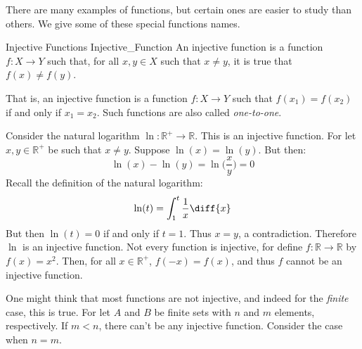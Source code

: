                 There are many examples of functions, but certain
                ones are easier to study than others. We give some
                of these special functions names.
                \begin{ldefinition}{Injective Functions}
                      {Injective_Function}
                    An \gls{injective function} is a function
                    $f:X\rightarrow{Y}$ such that, for all
                    $x,y\in{X}$ such that $x\ne{y}$, it is true that
                    $f(x)\ne{f}(y)$.
                \end{ldefinition}
                That is, an injective function is a function
                $f:X\rightarrow{Y}$ such that $f(x_{1})=f(x_{2})$
                if and only if $x_{1}=x_{2}$. Such functions are also
                called \textit{one-to-one}.
                \begin{lexample}
                    Consider the natural logarithm
                    $\ln:\mathbb{R}^{+}\rightarrow\mathbb{R}$. This
                    is an injective function. For let
                    $x,y\in\mathbb{R}^{+}$ be such that $x\ne{y}$.
                    Suppose $\ln(x)=\ln(y)$. But then:
                    \begin{equation}
                        \ln(x)-\ln(y)=\ln\Big(\frac{x}{y}\Big)=0
                    \end{equation}
                    Recall the definition of the natural logarithm:
                    \begin{equation}
                        \ln(t)=\int_{1}^{t}\frac{1}{x}\diff{x}
                    \end{equation}
                    But then $\ln(t)=0$ if and only if $t=1$. Thus
                    $x=y$, a contradiction. Therefore $\ln$ is an
                    injective function. Not every function is
                    injective, for define
                    $f:\mathbb{R}\rightarrow\mathbb{R}$ by
                    $f(x)=x^{2}$. Then, for all $x\in\mathbb{R}^{+}$,
                    $f(\minus{x})=f(x)$, and thus $f$ cannot be an
                    injective function.
                \end{lexample}
                One might think that most functions are not injective,
                and indeed for the \textit{finite} case, this is true.
                For let $A$ and $B$ be finite sets with $n$ and $m$
                elements, respectively. If $m<n$, there can't be
                any injective function. Consider the case when $n=m$.
